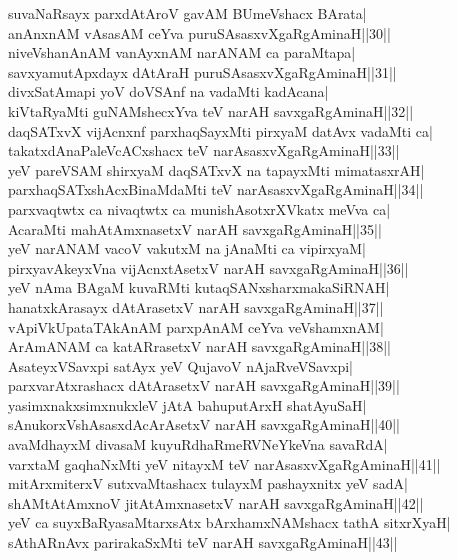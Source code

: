 \documentclass{article}
\begin{document}
suvaNaRsayx parxdAtAroV gavAM BUmeVshacx BArata|\\
anAnxnAM vAsasAM ceYva puruSAsasxvXgaRgAminaH||30||\\
niveVshanAnAM vanAyxnAM narANAM ca paraMtapa|\\
savxyamutApxdayx dAtAraH puruSAsasxvXgaRgAminaH||31||\\
divxSatAmapi yoV doVSAnf na vadaMti kadAcana|\\
kiVtaRyaMti guNAMshecxYva teV narAH savxgaRgAminaH||32||\\
daqSATxvX vijAcnxnf parxhaqSayxMti pirxyaM datAvx vadaMti ca|\\
takatxdAnaPaleVcACxshacx teV narAsasxvXgaRgAminaH||33||\\
yeV pareVSAM shirxyaM daqSATxvX na tapayxMti mimatasxrAH|\\
parxhaqSATxshAcxBinaMdaMti teV narAsasxvXgaRgAminaH||34||\\
parxvaqtwtx ca nivaqtwtx ca munishAsotxrXVkatx meVva ca|\\
AcaraMti mahAtAmxnasetxV narAH savxgaRgAminaH||35||\\
yeV  narANAM vacoV vakutxM na jAnaMti ca vipirxyaM|\\
pirxyavAkeyxVna vijAcnxtAsetxV narAH savxgaRgAminaH||36||\\
yeV nAma BAgaM kuvaRMti kutaqSANxsharxmakaSiRNAH|\\
hanatxkArasayx dAtArasetxV narAH savxgaRgAminaH||37||\\
vApiVkUpataTAkAnAM parxpAnAM ceYva veVshamxnAM|\\
ArAmANAM ca katARrasetxV narAH savxgaRgAminaH||38||\\
AsateyxVSavxpi satAyx yeV QujavoV nAjaRveVSavxpi|\\
parxvarAtxrashacx dAtArasetxV narAH savxgaRgAminaH||39||\\
yasimxnakxsimxnukxleV jAtA bahuputArxH shatAyuSaH|\\
sAnukorxVshAsasxdAcArAsetxV narAH savxgaRgAminaH||40||\\
avaMdhayxM divasaM kuyuRdhaRmeRVNeYkeVna savaRdA|\\
varxtaM gaqhaNxMti yeV nitayxM teV narAsasxvXgaRgAminaH||41||\\
mitArxmiterxV sutxvaMtashacx tulayxM pashayxnitx yeV sadA|\\
shAMtAtAmxnoV jitAtAmxnasetxV narAH savxgaRgAminaH||42||\\
yeV ca suyxBaRyasaMtarxsAtx bArxhamxNAMshacx tathA sitxrXyaH|\\
sAthARnAvx parirakaSxMti teV narAH savxgaRgAminaH||43||\\
\end{document}
